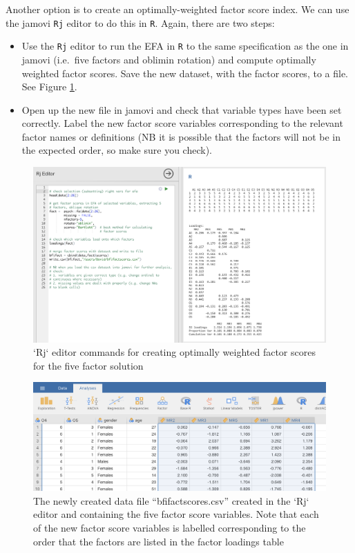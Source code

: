 \documentclass[
]{book}
\providecommand{\tightlist}{%
  \setlength{\itemsep}{0pt}\setlength{\parskip}{0pt}}
\begin{document}
Another option is to create an optimally-weighted factor score index. We can use the jamovi \texttt{Rj} editor to do this in \texttt{R}. Again, there are two steps:

\begin{itemize}
\tightlist
\item
  Use the \texttt{Rj} editor to run the EFA in \texttt{R} to the same specification as the one in jamovi (i.e.~five factors and oblimin rotation) and compute optimally weighted factor scores. Save the new dataset, with the factor scores, to a file. See Figure \ref{fig:fa10}.
\item
  Open up the new file in jamovi and check that variable types have been set correctly. Label the new factor score variables corresponding to the relevant factor names or definitions (NB it is possible that the factors will not be in the expected order, so make sure you check).
\end{itemize}

\begin{figure}

{\centering \includegraphics[width=1\linewidth]{img/factoranalysis/fa10} 

}

\caption{`Rj` editor commands for creating optimally weighted factor scores for the five factor solution}\label{fig:fa10}
\end{figure}

\begin{figure}

{\centering \includegraphics[width=1\linewidth]{img/factoranalysis/fa11} 

}

\caption{The newly created data file “bfifactscores.csv” created in the `Rj` editor and containing the five factor score variables. Note that each of the new factor score variables is labelled corresponding to the order that the factors are listed in the factor loadings table}\label{fig:fa11}
\end{figure}
\end{document}
